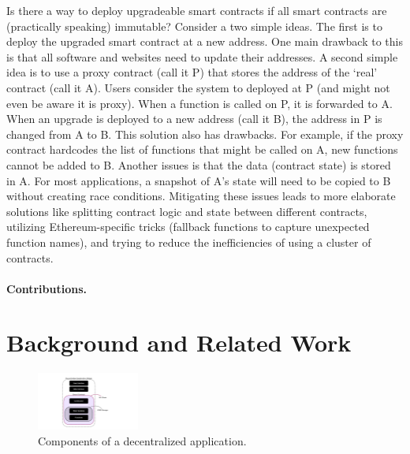 Is there a way to deploy upgradeable smart contracts if all smart contracts are (practically speaking) immutable? Consider a two simple ideas. The first is to deploy the upgraded smart contract at a new address. One main drawback to this is that all software and websites need to update their addresses. A second simple idea is to use a proxy contract (call it P) that stores the address of the `real' contract (call it A). Users consider the system to deployed at P (and might not even be aware it is proxy). When a function is called on P, it is forwarded to A. When an upgrade is deployed to a new address (call it B), the address in P is changed from A to B. This solution also has drawbacks. For example, if the proxy contract hardcodes the list of functions that might be called on A, new functions cannot be added to B. Another issues is that the data (contract state) is stored in A. For most applications, a snapshot of A's state will need to be copied to B without creating race conditions. Mitigating these issues leads to more elaborate solutions like splitting contract logic and state between different contracts, utilizing Ethereum-specific tricks (fallback functions to capture unexpected function names), and trying to reduce the inefficiencies of using a cluster of contracts.

\paragraph{Contributions.} 



\section{Background and Related Work}

\begin{figure}[t]
  \centering
      \includegraphics[width=0.3\textwidth]{figures/dapp.pdf}
  \caption{Components of a decentralized application.\label{fig:dapp}}
 \end{figure}

